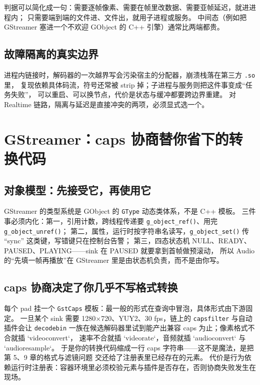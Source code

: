 \documentclass[12pt,a4paper,fontset=fandol]{ctexbook}
\newcommand{\Fn}[1]{\texttt{#1()}}
\newcommand{\Tp}[1]{\texttt{#1}}
\newcommand{\Bk}{\discretionary{}{}{}}
\newcommand{\Lang}[1]{\textsf{#1}}
\newcommand{\CPP}{\Lang{C++}}
\newcommand{\DomAud}{\Lang{Audio}}
\newcommand{\DomRT}{\Lang{Realtime}}
\begin{document}
判据可以简化成一句：需要逐帧像素、需要在帧里改数据、需要亚帧延迟，就进进程内；
只需要端到端的文件进、文件出，就用子进程或服务。
中间态（例如把 GStreamer 塞进一个不欢迎 GObject 的 \CPP{} 引擎）通常比两端都贵。

\subsection*{故障隔离的真实边界}
进程内链接时，解码器的一次越界写会污染宿主的分配器，崩溃栈落在第三方 \Tp{.{\Bk}so} 里，
复现依赖具体码流，符号还常被 strip 掉；子进程与服务则把这件事变成``任务失败''，
可以重启、可以换节点，代价是状态与缓冲都要跨边界重建。
对 \DomRT{} 链路，隔离与延迟是直接冲突的两项，必须显式选一个。

\section{GStreamer：caps 协商替你省下的转换代码}

\subsection*{对象模型：先接受它，再使用它}
GStreamer 的类型系统是 GObject 的 \Tp{GType} 动态类体系，不是 \CPP{} 模板。
三件事必须内化：第一，引用计数，跨线程传递要 \Fn{g\_{\Bk}object\_{\Bk}ref}、用完 \Fn{g\_{\Bk}object\_{\Bk}unref}；
第二，属性，运行时按字符串名读写，\Fn{g\_{\Bk}object\_{\Bk}set} 传 ``sync'' 这类键，写错键只在控制台告警；
第三，四态状态机 NULL、READY、PAUSED、PLAYING——sink 在 PAUSED 就要拿到首帧做预滚动，
所以 \DomAud{} 的``先填一帧再播放''在 GStreamer 里是由状态机负责，而不是由你写。

\subsection*{caps 协商决定了你几乎不写格式转换}
每个 pad 挂一个 \Tp{GstCaps} 模板：最一般的形式在查询中冒泡，具体形式由下游固定。
一旦某个 sink 需要 1280$\times$720、YUY2、30 fps，链上的 \Tp{capsfilt{\Bk}er} 与自动插件会让
\Tp{decodebin} 一族在候选解码器里试到能产出兼容 caps 为止；像素格式不合就插 `videoconvert`，
速率不合就插 `videorate`，音频就插 `audioconvert` 与 `audioresample`。
于是你的转换代码缩成一行 caps 字符串——这不是魔法，是把第 5、9 章的格式与滤镜问题
交还给了注册表里已经存在的元素。
代价是行为依赖运行时注册表：容器环境里必须校验元素与插件是否存在，否则协商失败发生在现场。
\end{document}
